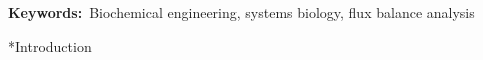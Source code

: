 \documentclass[12pt]{article}
\makeatletter
\renewcommand\section{\@startsection
	{subsection}{2}{0mm}
	{-0.2in}
	{0.05\baselineskip}
	{\normalfont\large\bfseries}}
\makeatother
\begin{document}
\vspace{0.1in}
{\noindent \textbf{Keywords:}~Biochemical engineering, systems biology, flux balance analysis}




\pagebreak

\setcounter{page}{1}



\section*{Introduction}
\end{document}
